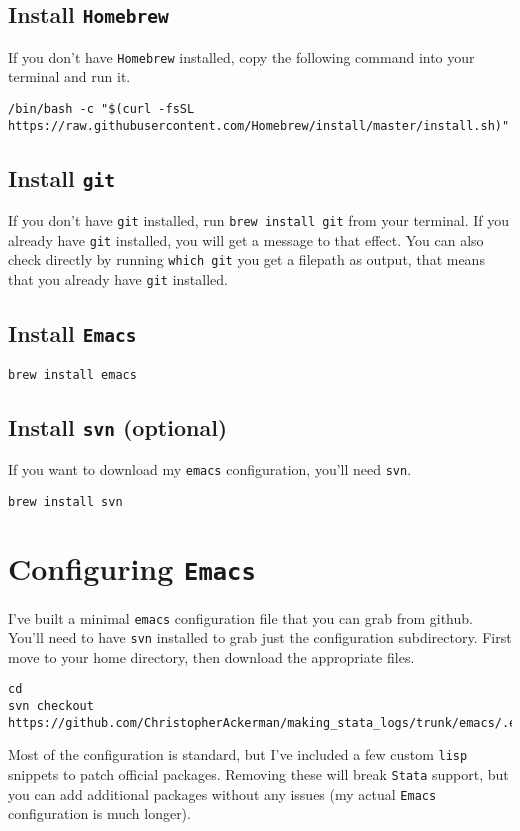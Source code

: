 \documentclass[a4paper]{article}
\begin{document}
\subsection{Install \texttt{Homebrew}}
\label{sec:orgdf12993}
If you don't have \texttt{Homebrew} installed, copy the following command into your terminal and run it.


\begin{verbatim}
/bin/bash -c "$(curl -fsSL https://raw.githubusercontent.com/Homebrew/install/master/install.sh)"
\end{verbatim}

\subsection{Install \texttt{git}}
\label{sec:org1e0491d}
   If you don't have \texttt{git} installed, run \texttt{brew install git} from your terminal.
If you already have \texttt{git} installed, you will get a message to that effect. You can also check directly by running
\texttt{which git} you get a filepath as output, that means that you already have \texttt{git} installed.

\subsection{Install \texttt{Emacs}}
\label{sec:orgcced5b6}

\begin{verbatim}
brew install emacs
\end{verbatim}

\subsection{Install \texttt{svn} (optional)}
\label{sec:orge5c27f4}
If you want to download my \texttt{emacs} configuration, you'll need \texttt{svn}.

\begin{verbatim}
brew install svn
\end{verbatim}

\section{Configuring \texttt{Emacs}}
\label{sec:org1a6f9b8}
I've built a minimal \texttt{emacs} configuration file that you can grab from github. You'll need to have \texttt{svn} installed to grab just the configuration subdirectory. First move to your home directory, then download the appropriate files.

\begin{verbatim}
cd 
svn checkout https://github.com/ChristopherAckerman/making_stata_logs/trunk/emacs/.emacs.d
\end{verbatim}
Most of the configuration is standard, but I've included a few custom \texttt{lisp} snippets to patch official packages. Removing these will break \texttt{Stata} support, but you can add additional packages without any issues (my actual \texttt{Emacs} configuration is much longer).
\end{document}
